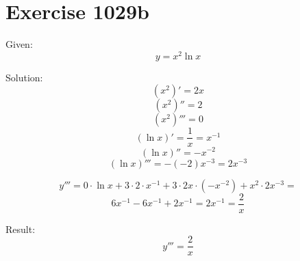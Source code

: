 \documentclass[a4paper, 10pt]{scrartcl}
\begin{document}
\section{Exercise 1029b}

Given:
\[
y = x^{2}\ln{x}
\]

Solution:
\[
(x^{2})' = 2x
\]
\[
(x^{2})'' = 2
\]
\[
(x^{2})''' = 0
\]
\[
(\ln{x})' = \frac{1}{x} = x^{-1}
\]
\[
(\ln{x})'' = -x^{-2}
\]
\[
(\ln{x})''' = -(-2)x^{-3} = 2x^{-3}
\]

\[
y''' = 0\cdot\ln{x} + 3\cdot 2\cdot x^{-1} + 3\cdot 2x\cdot (-x^{-2}) + x^{2}\cdot 2x^{-3} =
\]
\[
6x^{-1} - 6x^{-1} + 2x^{-1} = 2x^{-1} = \frac{2}{x}
\]

Result:
\[
y''' = \frac{2}{x}
\]
\end{document}
